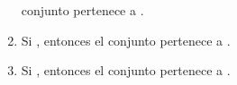 \begin{isabellebody}
\begin{isamarkuptext}
\begin{definicion}
\begin{enumerate}
        conjunto  pertenece a .
      \item Si , entonces el conjunto  pertenece a .
      \item Si , entonces el conjunto  pertenece a .
    \end{enumerate}
  \end{definicion}


\end{isamarkuptext}
\end{isabellebody}
